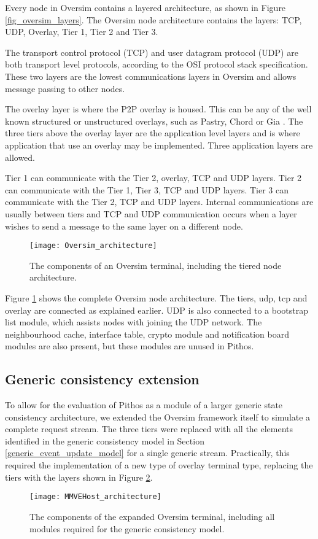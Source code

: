 Every node in Oversim contains a layered architecture, as shown in Figure \ref{fig_oversim_layers}. The Oversim node architecture contains the layers: TCP, UDP, Overlay, Tier 1, Tier 2 and Tier 3.

The transport control protocol (TCP) and user datagram protocol (UDP) are both transport level protocols, according to the OSI protocol stack specification. These two layers are the lowest communications layers in Oversim and allows message passing to other nodes.

The overlay layer is where the P2P overlay is housed. This can be any of the well known structured or unstructured overlays, such as Pastry, Chord or Gia \cite{Chawathe_gia}. The three tiers above the overlay layer are the application level layers and is where application that use an overlay may be implemented. Three application layers are allowed.

Tier 1 can communicate with the Tier 2, overlay, TCP and UDP layers. Tier 2 can communicate with the Tier 1, Tier 3, TCP and UDP layers. Tier 3 can communicate with the Tier 2, TCP and UDP layers. Internal communications are usually between tiers and TCP and UDP communication occurs when a layer wishes to send a message to the same layer on a different node.

\begin{figure}[htbp]
 \centering
 \texttt{[image: Oversim\_architecture]}
 \caption{The components of an Oversim terminal, including the tiered node architecture.}
 \label{fig_oversim_architecture}
\end{figure}
%
Figure \ref{fig_oversim_architecture} shows the complete Oversim node architecture. The tiers, udp, tcp and overlay are connected as explained earlier. UDP is also connected to a bootstrap list module, which assists nodes with joining the UDP network. The neighbourhood cache, interface table, crypto module and notification board modules are also present, but these modules are unused in Pithos.

    \subsection{Generic consistency extension}
    \label{generic_consistency_extension}

To allow for the evaluation of Pithos as a module of a larger generic state consistency architecture, we extended the Oversim framework itself to simulate a complete request stream. The three tiers were replaced with all the elements identified in the generic consistency model in Section \ref{generic_event_update_model} for a single generic stream. Practically, this required the implementation of a new type of overlay terminal type, replacing the tiers with the layers shown in Figure \ref{fig_mmvehost_architecture}.
%
\begin{figure}[htbp]
 \centering
 \texttt{[image: MMVEHost\_architecture]}
 \caption{The components of the expanded Oversim terminal, including all modules required for the generic consistency model.}
 \label{fig_mmvehost_architecture}
\end{figure}

